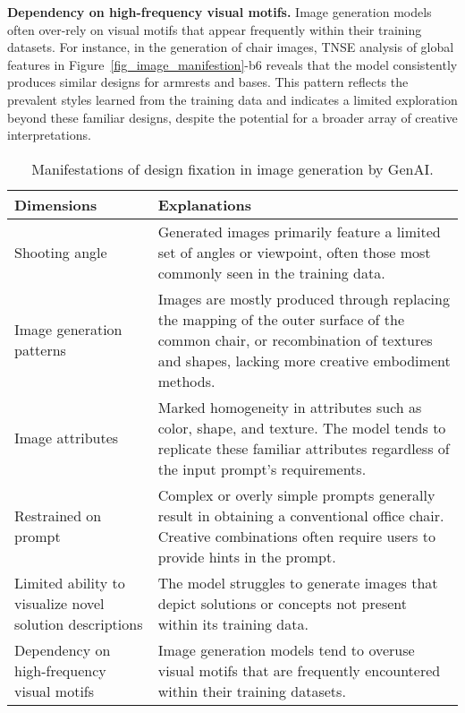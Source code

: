 \textbf{Dependency on high-frequency visual motifs.} Image generation models often over-rely on visual motifs that appear frequently within their training datasets. For instance, in the generation of chair images, TNSE analysis of global features in Figure~\ref{fig_image_manifestion}-b6 reveals that the model consistently produces similar designs for armrests and bases. This pattern reflects the prevalent styles learned from the training data and indicates a limited exploration beyond these familiar designs, despite the potential for a broader array of creative interpretations.


\begin{table}[ht]
\centering
\caption{Manifestations of design fixation in image generation by GenAI.}
\label{tab:manifestations_image}
\begin{tabular}
{p{}p{}}
\toprule
\textbf{Dimensions} & \textbf{Explanations}\\ 
\midrule
\midrule
Shooting angle & Generated images primarily feature a limited set of angles or viewpoint, often those most commonly seen in the training data. \\
\midrule
Image generation patterns & Images are mostly produced through replacing the mapping of the outer surface of the common chair, or recombination of textures and shapes, lacking more creative embodiment methods. \\
\midrule
Image attributes & Marked homogeneity in attributes such as color, shape, and texture. The model tends to replicate these familiar attributes regardless of the input prompt's requirements. \\
\midrule
Restrained on prompt & Complex or overly simple prompts generally result in obtaining a conventional office chair. 
\newline
Creative combinations often require users to provide hints in the prompt. \\
\midrule
Limited ability to visualize novel solution descriptions & The model struggles to generate images that depict solutions or concepts not present within its training data. \\
\midrule
Dependency on high-frequency visual motifs &  Image generation models tend to overuse visual motifs that are frequently encountered within their training datasets. \\
\bottomrule
\end{tabular}
\end{table}

